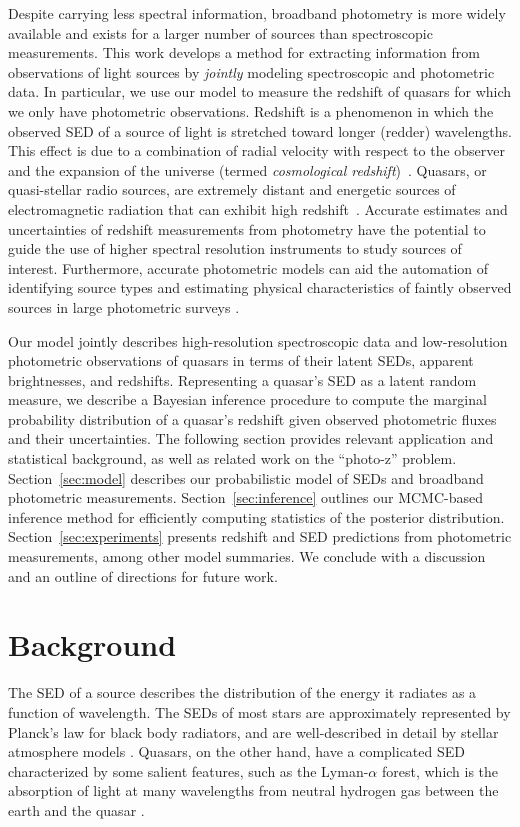 \documentclass{article} %
\begin{document}
Despite carrying less spectral information, broadband photometry is more widely available and exists for a larger number of sources than spectroscopic measurements. 
This work develops a method for extracting information from observations of light sources by \emph{jointly} modeling spectroscopic and photometric data.  
In particular, we use our model to measure the redshift of quasars for which we only have photometric observations.  
Redshift is a phenomenon in which the observed SED of a source of light is stretched toward longer (redder) wavelengths.
This effect is due to a combination of radial velocity with respect to the observer and the expansion of the universe (termed \emph{cosmological redshift})~\cite{hogg1999distance, harrison1993redshift}.  
Quasars, or quasi-stellar radio sources, are extremely distant and energetic sources of electromagnetic radiation that can exhibit high redshift~\cite{silk1997quasars}.  
Accurate estimates and uncertainties of redshift measurements from photometry have the potential to guide the use of higher spectral resolution instruments to study sources of interest.  
Furthermore, accurate photometric models can aid the automation of identifying source types and estimating physical characteristics of faintly observed sources in large photometric surveys \cite{regier2015}.  

Our model jointly describes high-resolution spectroscopic data and low-resolution photometric observations of quasars in terms of their latent SEDs, apparent brightnesses, and redshifts. 
Representing a quasar's SED as a latent random measure, we describe a Bayesian inference procedure to compute the marginal probability distribution of a quasar's redshift given observed photometric fluxes and their uncertainties.  
The following section provides relevant application and statistical background, as well as related work on the ``photo-z'' problem.
Section~\ref{sec:model} describes our probabilistic model of SEDs and broadband photometric measurements.
Section~\ref{sec:inference} outlines our MCMC-based inference method for efficiently computing statistics of the posterior distribution.
Section~\ref{sec:experiments} presents redshift and SED predictions from photometric measurements, among other model summaries.
We conclude with a discussion and an outline of directions for future work.  

\section{Background}
\label{sec:background}
The SED of a source describes the distribution of the energy it radiates as a function of wavelength.  
The SEDs of most stars are approximately represented by Planck’s law for black body radiators, and are well-described in detail by stellar atmosphere models \cite{gray2001physical}.  
Quasars, on the other hand, have a complicated SED characterized by some salient features, such as the Lyman-$\alpha$ forest, which is the absorption of light at many wavelengths from neutral hydrogen gas between the earth and the quasar \cite{weinberg2003lymanalpha}.
\end{document}
